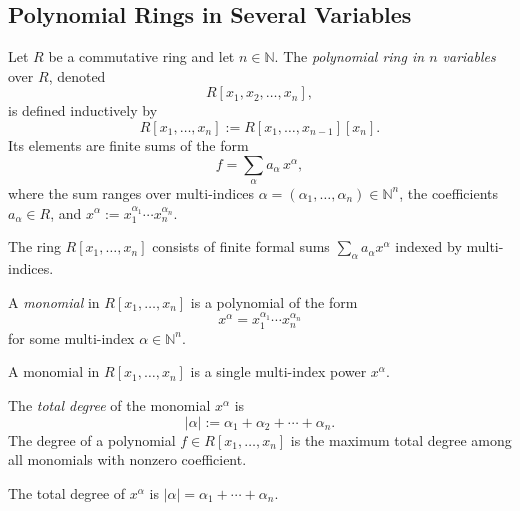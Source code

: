 \subsection*{Polynomial Rings in Several Variables}

\begin{definition}
\label{def:polynomial-ring-in-n-variables}
Let $R$ be a commutative ring and let $n \in \mathbb{N}$.
The \emph{polynomial ring in $n$ variables} over $R$, denoted
\[
R[x_1, x_2, \dots, x_n],
\]
is defined inductively by
\[
R[x_1, \dots, x_n] := R[x_1, \dots, x_{n-1}][x_n].
\]
Its elements are finite sums of the form
\[
f = \sum_{\alpha} a_\alpha \, x^\alpha,
\]
where the sum ranges over multi-indices
$\alpha = (\alpha_1, \dots, \alpha_n) \in \mathbb{N}^n$,
the coefficients $a_\alpha \in R$, and
$x^\alpha := x_1^{\alpha_1} \cdots x_n^{\alpha_n}$.
\end{definition}

\begin{remark*}
The ring $R[x_1,\dots,x_n]$ consists of finite formal sums
$\sum_\alpha a_\alpha x^\alpha$ indexed by multi-indices.
\end{remark*}

\begin{definition}[Monomial]
\label{def:monomial}
A \emph{monomial} in $R[x_1, \dots, x_n]$ is a polynomial
of the form
\[
x^\alpha = x_1^{\alpha_1} \cdots x_n^{\alpha_n}
\]
for some multi-index $\alpha \in \mathbb{N}^n$.
\end{definition}

\begin{remark*}
A monomial in $R[x_1,\dots,x_n]$ is a single multi-index power $x^\alpha$.
\end{remark*}

\begin{definition}
\label{def:total-degree}
The \emph{total degree} of the monomial $x^\alpha$ is
\[
|\alpha| := \alpha_1 + \alpha_2 + \cdots + \alpha_n.
\]
The degree of a polynomial $f \in R[x_1,\dots,x_n]$ is
the maximum total degree among all monomials with nonzero coefficient.
\end{definition}

\begin{remark*}
The total degree of $x^\alpha$ is $|\alpha|=\alpha_1+\cdots+\alpha_n$.
\end{remark*}

